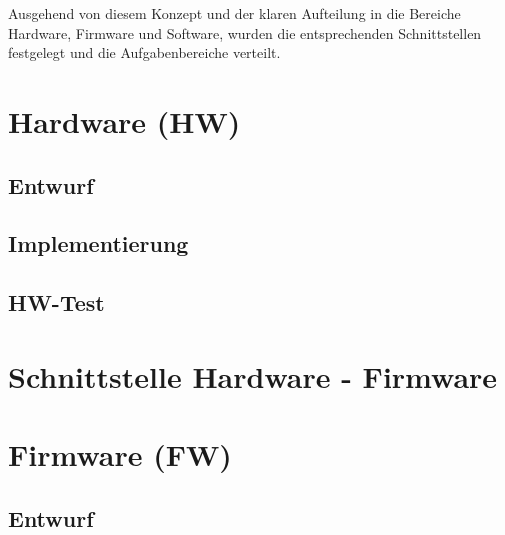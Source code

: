 \documentclass[a4paper, portrait, 12pt]{scrartcl} %
\begin{document}
Ausgehend von diesem Konzept und der klaren Aufteilung in die Bereiche Hardware, Firmware und Software, wurden die entsprechenden Schnittstellen festgelegt und die Aufgabenbereiche verteilt.

\pagebreak

\section{Hardware (HW)}
\subsection{Entwurf}
\subsection{Implementierung}
\subsection{HW-Test}

\pagebreak

\section{Schnittstelle Hardware - Firmware}

\pagebreak


\section{Firmware (FW)}
\subsection{Entwurf}
\end{document}
